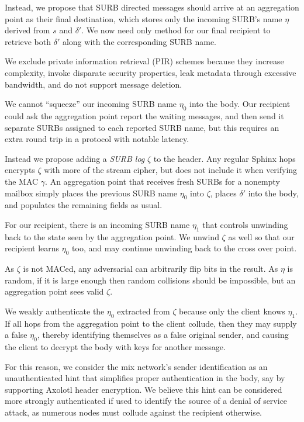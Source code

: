 \documentclass[twoside,letterpaper]{llncs}
\begin{document}
Instead, we propose that SURB directed messages should arrive at
an aggregation point as their final destination, which stores only
the incoming SURB's name $\eta$ derived from $s$ and $\delta'$.  
We now need only method for our final recipient to retrieve both
$\delta'$ along with the corresponding SURB name.  

We exclude private information retrieval (PIR) schemes because
they increase complexity, invoke disparate security properties,
leak metadata through excessive bandwidth, and do not support
message deletion.  

We cannot ``squeeze'' our incoming SURB name $\eta_0$ into the body.
Our recipient could ask the aggregation point report the waiting
messages, and then send it separate SURBs assigned to each reported
SURB name, but this requires an extra round trip in a protocol with
notable latency. 

Instead we propose adding a {\it SURB log} $\zeta$ to the header.
Any regular Sphinx hops encrypts $\zeta$ with more of the stream
cipher, but does not include it when verifying the MAC $\gamma$.
An aggregation point that receives fresh SURBs for a nonempty
mailbox simply places the previous SURB name $\eta_0$ into $\zeta$,
places $\delta'$ into the body, and populates the remaining fields
as usual. 

For our recipient, there is an incoming SURB name $\eta_1$ that 
controls unwinding back to the state seen by the aggregation point.
We unwind $\zeta$ as well so that our recipient learns $\eta_0$ too,
and may continue unwinding back to the cross over point.

As $\zeta$ is not MACed, any adversarial can arbitrarily flip bits
in the result.  As $\eta$ is random, if it is large enough then
random collisions should be impossible, but an aggregation point
sees valid $\zeta$.  

We weakly authenticate the $\eta_0$ extracted from $\zeta$ because
only the client knows $\eta_1$.  If all hops from the aggregation
point to the client collude, then they may supply a false $\eta_0$,
thereby identifying themselves as a false original sender, and
causing the client to decrypt the body with keys for another message.

For this reason, we consider the mix network's sender identification
as an unauthenticated hint that simplifies proper authentication in
the body, say by supporting Axolotl header encryption.
We believe this hint can be considered more strongly authenticated
if used to identify the source of a denial of service attack, as
numerous nodes must collude against the recipient otherwise.
\end{document}
